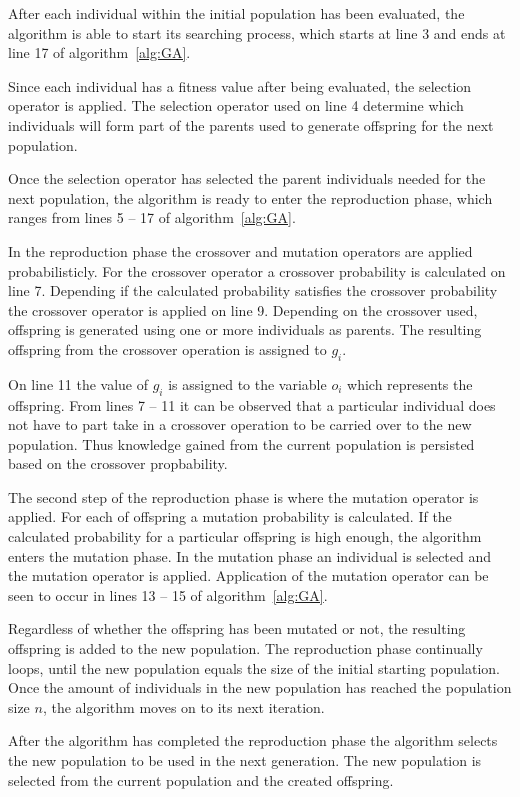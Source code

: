 After each individual within the initial population has been evaluated, the algorithm is able to start its searching process, which starts at line 3 and ends at line 17 of algorithm~\ref{alg:GA}.

Since each individual has a fitness value after being evaluated, the selection operator is applied. The selection operator used on line 4 determine which individuals will form part of the parents used to generate offspring for the next population.

Once the selection operator has selected the parent individuals needed for the next population, the algorithm is ready to enter the reproduction phase, which ranges from lines 5 -- 17 of algorithm~\ref{alg:GA}.

In the reproduction phase the crossover and mutation operators are applied probabilisticly. For the crossover operator a crossover probability is calculated on line 7. Depending if the calculated probability satisfies the crossover probability the crossover operator is applied on line 9. Depending on the crossover used, offspring is generated using one or more individuals as parents. The resulting offspring from the crossover operation is assigned to $g_i$.

On line 11 the value of $g_i$ is assigned to the variable $o_i$ which represents the offspring. From lines 7 -- 11 it can be observed that a particular individual does not have to part take in a crossover operation to be carried over to the new population. Thus knowledge gained from the current population is persisted based on the crossover propbability.

The second step of the reproduction phase is where the mutation operator is applied. For each of offspring a mutation probability is calculated. If the calculated probability for a particular offspring is high enough, the algorithm enters the mutation phase. In the mutation phase an individual is selected and the mutation operator is applied. Application of the mutation operator can be seen to occur in lines 13 -- 15 of algorithm~\ref{alg:GA}.

Regardless of whether the offspring has been mutated or not, the resulting offspring is added to the new population. The reproduction phase continually loops, until the new population equals the size of the initial starting population. Once the amount of individuals in the new population has reached the population size $n$, the algorithm moves on to its next iteration.

After the algorithm has completed the reproduction phase the algorithm selects the new population to be used in the next generation. The new population is selected from the current population and the created offspring.


